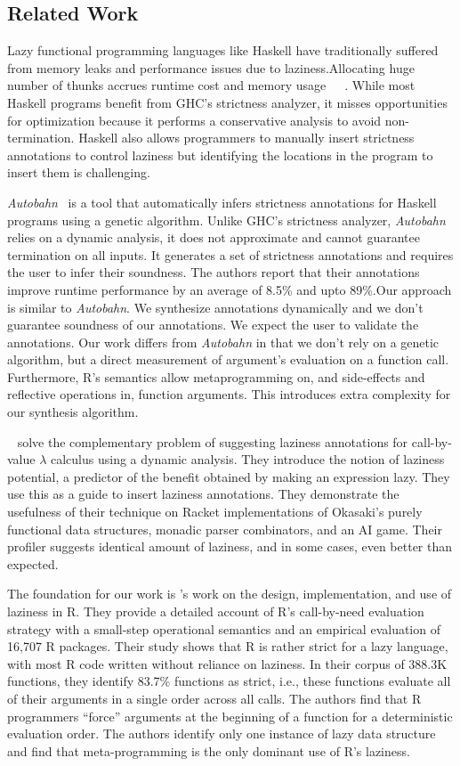 \documentclass[screen,acmsmall]{acmart}
\begin{document}
\subsection{Related Work}
Lazy functional programming languages like Haskell have traditionally suffered
from memory leaks and performance issues due to laziness.Allocating huge number
of thunks accrues runtime cost and memory
usage~\cite{transformopt}~\cite{stricteffective}~\cite{opteval}. While most
Haskell programs benefit from GHC's strictness analyzer, it misses opportunities
for optimization because it performs a conservative analysis to avoid
non-termination. Haskell also allows programmers to manually insert strictness
annotations to control laziness but identifying the locations in the program to
insert them is challenging.


\emph{Autobahn}~\cite{autobahn} is a tool that automatically infers strictness
annotations for Haskell programs using a genetic algorithm. Unlike GHC's
strictness analyzer, \emph{Autobahn} relies on a dynamic analysis, it does not
approximate and cannot guarantee termination on all inputs. It generates a set
of strictness annotations and requires the user to infer their soundness. The
authors report that their annotations improve runtime performance by an average
of 8.5\% and upto 89\%.Our approach is similar to \emph{Autobahn}. We synthesize
annotations dynamically and we don't guarantee soundness of our annotations. We
expect the user to validate the annotations. Our work differs from
\emph{Autobahn} in that we don't rely on a genetic algorithm, but a direct
measurement of argument's evaluation on a function call. Furthermore, R's
semantics allow metaprogramming on, and side-effects and reflective operations
in, function arguments. This introduces extra complexity for our synthesis
algorithm.

~\cite{lazyprof} solve the complementary problem of suggesting laziness
annotations for call-by-value $\lambda$ calculus using a dynamic analysis. They
introduce the notion of laziness potential, a predictor of the benefit obtained
by making an expression lazy. They use this as a guide to insert laziness
annotations. They demonstrate the usefulness of their technique on Racket
implementations of Okasaki's purely functional data structures, monadic parser
combinators, and an AI game. Their profiler suggests identical amount of
laziness, and in some cases, even better than expected.


The foundation for our work is \cite{oopsla19b}'s work on the design,
implementation, and use of laziness in R. They provide a detailed account of R's
call-by-need evaluation strategy with a small-step operational semantics and an
empirical evaluation of 16,707 R packages. Their study shows that R is rather
strict for a lazy language, with most R code written without reliance on
laziness. In their corpus of 388.3K functions, they identify 83.7\% functions as
strict, i.e., these functions evaluate all of their arguments in a single order
across all calls. The authors find that R programmers ``force'' arguments at the
beginning of a function for a deterministic evaluation order. The authors
identify only one instance of lazy data structure and find that meta-programming
is the only dominant use of R's laziness.
\end{document}
